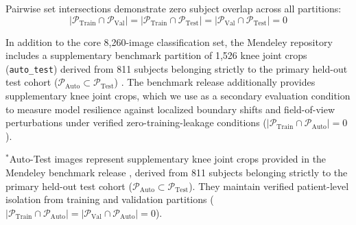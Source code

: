 \documentclass[10pt,journal]{IEEEtran}
\begin{document}
Pairwise set intersections demonstrate zero subject overlap across all partitions:
\begin{equation}
|\mathcal{P}_{\text{Train}} \cap \mathcal{P}_{\text{Val}}| = |\mathcal{P}_{\text{Train}} \cap \mathcal{P}_{\text{Test}}| = |\mathcal{P}_{\text{Val}} \cap \mathcal{P}_{\text{Test}}| = 0
\label{eq:leakage_free}
\end{equation}

In addition to the core 8,260-image classification set, the Mendeley repository includes a supplementary benchmark partition of 1,526 knee joint crops (\texttt{auto\_test}) derived from 811 subjects belonging strictly to the primary held-out test cohort ($\mathcal{P}_{\text{Auto}} \subset \mathcal{P}_{\text{Test}}$) \cite{chen2018dataset}. The benchmark release additionally provides supplementary knee joint crops, which we use as a secondary evaluation condition to measure model resilience against localized boundary shifts and field-of-view perturbations under verified zero-training-leakage conditions ($|\mathcal{P}_{\text{Train}} \cap \mathcal{P}_{\text{Auto}}| = 0$).

\begin{table}[t]
\centering
\caption{Patient-level dataset stratification and secondary evaluation subsets.}
\label{tab:data_split}
\scriptsize
\setlength{\tabcolsep}{3.5pt}
\renewcommand{\arraystretch}{1.15}
\vspace{2pt}
\parbox{\columnwidth}{\footnotesize $^*$Auto-Test images represent supplementary knee joint crops provided in the Mendeley benchmark release \cite{chen2018dataset}, derived from 811 subjects belonging strictly to the primary held-out test cohort ($\mathcal{P}_{\text{Auto}} \subset \mathcal{P}_{\text{Test}}$). They maintain verified patient-level isolation from training and validation partitions ($|\mathcal{P}_{\text{Train}} \cap \mathcal{P}_{\text{Auto}}| = |\mathcal{P}_{\text{Val}} \cap \mathcal{P}_{\text{Auto}}| = 0$).}
\end{table}
\end{document}
